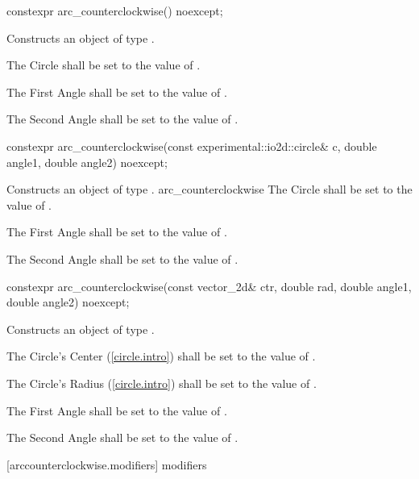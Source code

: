 \begin{itemdecl}
constexpr arc_counterclockwise() noexcept;
\end{itemdecl}
\begin{itemdescr}
\pnum
\effects
Constructs an object of type .

\pnum
The Circle shall be set to the value of .

\pnum
The First Angle shall be set to the value of .

\pnum
The Second Angle shall be set to the value of .
\end{itemdescr}

\begin{itemdecl}
constexpr arc_counterclockwise(const experimental::io2d::circle& c,
  double angle1, double angle2) noexcept;
\end{itemdecl}
\begin{itemdescr}
\pnum
\effects
Constructs an object of type .
arc_counterclockwise
\pnum
The Circle shall be set to the value of .

\pnum
The First Angle shall be set to the value of .

\pnum
The Second Angle shall be set to the value of .
\end{itemdescr}

\begin{itemdecl}
constexpr arc_counterclockwise(const vector_2d& ctr, double rad, double angle1,
  double angle2) noexcept;
\end{itemdecl}
\begin{itemdescr}
\pnum
\effects
Constructs an object of type .

\pnum
The Circle's Center (\ref{circle.intro}) shall be set to the value of .

\pnum
The Circle's Radius (\ref{circle.intro}) shall be set to the value of .

\pnum
The First Angle shall be set to the value of .

\pnum
The Second Angle shall be set to the value of .
\end{itemdescr}

 [arccounterclockwise.modifiers]{ modifiers}


